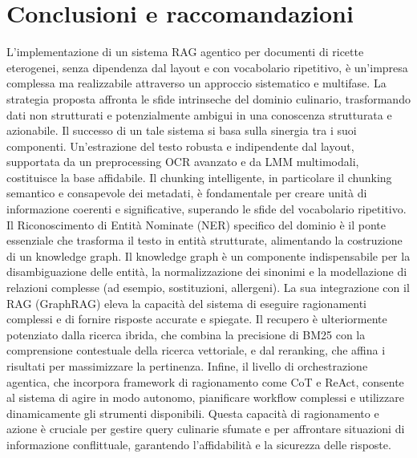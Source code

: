 \documentclass[a4paper, 11pt]{article}
\begin{document}
\section{Conclusioni e raccomandazioni}
L'implementazione di un sistema RAG agentico per documenti di ricette eterogenei, senza dipendenza dal layout e con vocabolario ripetitivo, è un'impresa complessa ma realizzabile attraverso un approccio sistematico e multifase. La strategia proposta affronta le sfide intrinseche del dominio culinario, trasformando dati non strutturati e potenzialmente ambigui in una conoscenza strutturata e azionabile.
Il successo di un tale sistema si basa sulla sinergia tra i suoi componenti. Un'estrazione del testo robusta e indipendente dal layout, supportata da un preprocessing OCR avanzato e da LMM multimodali, costituisce la base affidabile. Il chunking intelligente, in particolare il chunking semantico e consapevole dei metadati, è fondamentale per creare unità di informazione coerenti e significative, superando le sfide del vocabolario ripetitivo. Il Riconoscimento di Entità Nominate (NER) specifico del dominio è il ponte essenziale che trasforma il testo in entità strutturate, alimentando la costruzione di un knowledge graph.
Il knowledge graph è un componente indispensabile per la disambiguazione delle entità, la normalizzazione dei sinonimi e la modellazione di relazioni complesse (ad esempio, sostituzioni, allergeni). La sua integrazione con il RAG (GraphRAG) eleva la capacità del sistema di eseguire ragionamenti complessi e di fornire risposte accurate e spiegate. Il recupero è ulteriormente potenziato dalla ricerca ibrida, che combina la precisione di BM25 con la comprensione contestuale della ricerca vettoriale, e dal reranking, che affina i risultati per massimizzare la pertinenza.
Infine, il livello di orchestrazione agentica, che incorpora framework di ragionamento come CoT e ReAct, consente al sistema di agire in modo autonomo, pianificare workflow complessi e utilizzare dinamicamente gli strumenti disponibili. Questa capacità di ragionamento e azione è cruciale per gestire query culinarie sfumate e per affrontare situazioni di informazione conflittuale, garantendo l'affidabilità e la sicurezza delle risposte.
\end{document}
